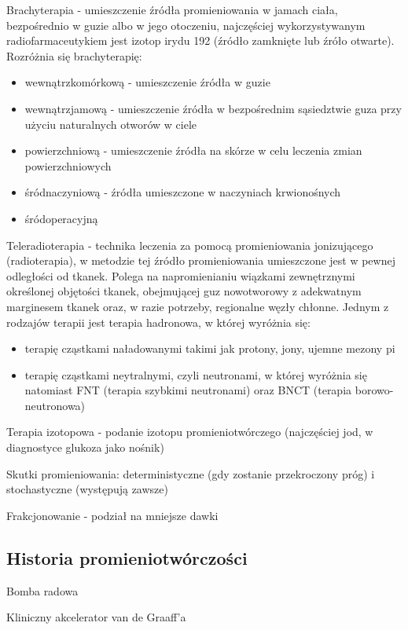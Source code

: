 \documentclass{article}
\begin{document}
Brachyterapia - umieszczenie źródła promieniowania w jamach ciała, bezpośrednio w guzie albo w jego otoczeniu, najczęściej wykorzystywanym radiofarmaceutykiem jest izotop irydu 192 (źródło zamknięte lub źróło otwarte). Rozróżnia się brachyterapię:
\begin{itemize}
    \item wewnątrzkomórkową - umieszczenie źródła w guzie
    \item wewnątrzjamową - umieszczenie źródła w bezpośrednim sąsiedztwie guza przy użyciu naturalnych otworów w ciele
    \item powierzchniową - umieszczenie źródła na skórze w celu leczenia zmian powierzchniowych
    \item śródnaczyniową - źródła umieszczone w naczyniach krwionośnych
    \item śródoperacyjną
\end{itemize}

Teleradioterapia - technika leczenia za pomocą promieniowania jonizującego (radioterapia), w metodzie tej źródło promieniowania umieszczone jest w pewnej odległości od tkanek. Polega na napromienianiu wiązkami zewnętrznymi określonej objętości tkanek, obejmującej guz nowotworowy z adekwatnym marginesem tkanek oraz, w razie potrzeby, regionalne węzły chłonne. Jednym z rodzajów terapii jest terapia hadronowa, w której wyróżnia się:
\begin{itemize}
    \item terapię cząstkami naładowanymi takimi jak protony, jony, ujemne mezony pi
    \item terapię cząstkami neytralnymi, czyli neutronami, w której wyróżnia się natomiast FNT (terapia szybkimi neutronami) oraz BNCT (terapia borowo-neutronowa)
\end{itemize}

Terapia izotopowa - podanie izotopu promieniotwórczego (najczęściej jod, w diagnostyce glukoza jako nośnik)

Skutki promieniowania: deterministyczne (gdy zostanie przekroczony próg) i stochastyczne (występują zawsze)

Frakcjonowanie - podział na mniejsze dawki

\subsection{Historia promieniotwórczości}

Bomba radowa 

Kliniczny akcelerator van de Graaff'a
\end{document}
